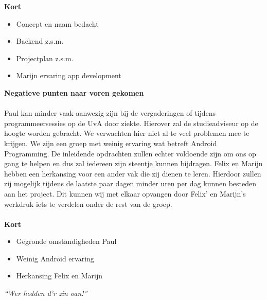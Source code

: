 \documentclass{uva-inf-article}
\begin{document}
\noindent
\textbf{Kort}
\begin{itemize}
\item Concept en naam bedacht
\item Backend z.s.m.
\item Projectplan z.s.m.
\item Marijn ervaring app development
\end{itemize}

\noindent
\textbf{Negatieve punten naar voren gekomen}\\\\
Paul kan minder vaak aanwezig zijn bij de vergaderingen of tijdens programmeersessies op de UvA door ziekte. Hierover zal de studieadviseur op de hoogte worden gebracht. We verwachten hier niet al te veel problemen mee te krijgen.
We zijn een groep met weinig ervaring wat betreft Android Programming. De inleidende opdrachten zullen echter voldoende zijn om ons op gang te helpen en dus zal iedereen zijn steentje kunnen bijdragen.
Felix en Marijn hebben een herkansing voor een ander vak die zij dienen te leren. Hierdoor zullen zij mogelijk tijdens de laatste paar dagen minder uren per dag kunnen besteden aan het project. Dit kunnen wij met elkaar opvangen door Felix’ en Marijn’s werkdruk iets te verdelen onder de rest van de groep.
\\\\

\noindent
\textbf{Kort}
\begin{itemize}
\item Gegronde omstandigheden Paul
\item Weinig Android ervaring
\item Herkansing Felix en Marijn

\end{itemize}

								\vfill	\hfill	\textit{“Wer hedden d’r zin oan!”}

\end{document}
